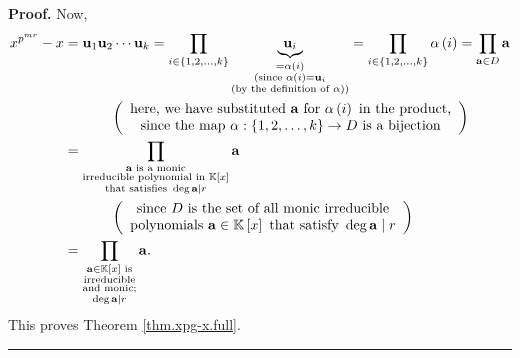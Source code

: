 \documentclass[numbers=enddot,12pt,final,onecolumn,notitlepage]{scrartcl}%
\theoremstyle{definition}
\newenvironment{proof}[1][Proof]{\noindent\textbf{#1.} }{\ \rule{0.5em}{0.5em}}
\let\prodnonlimits\prod
\renewcommand{\prod}{\prodnonlimits\limits}
\begin{document}
\begin{proof}
Now,%
\begin{align*}
x^{p^{mr}}-x  &  =\mathbf{u}_{1}\mathbf{u}_{2}\cdots\mathbf{u}_{k}=\prod
_{i\in\left\{  1,2,\ldots,k\right\}  }\underbrace{\mathbf{u}_{i}%
}_{\substack{=\alpha\left(  i\right)  \\\text{(since }\alpha\left(  i\right)
=\mathbf{u}_{i}\\\text{(by the definition of }\alpha\text{))}}}=\prod
_{i\in\left\{  1,2,\ldots,k\right\}  }\alpha\left(  i\right)  =\prod
_{\mathbf{a}\in D}\mathbf{a}\\
&  \ \ \ \ \ \ \ \ \ \ \left(
\begin{array}
[c]{c}%
\text{here, we have substituted }\mathbf{a}\text{ for }\alpha\left(  i\right)
\text{ in the product,}\\
\text{since the map }\alpha:\left\{  1,2,\ldots,k\right\}  \rightarrow D\text{
is a bijection}%
\end{array}
\right) \\
&  =\prod_{\substack{\mathbf{a}\text{ is a monic}\\\text{irreducible
polynomial in }\mathbb{K}\left[  x\right]  \\\text{that satisfies }%
\deg\mathbf{a}\mid r}}\mathbf{a}\\
&  \ \ \ \ \ \ \ \ \ \ \left(
\begin{array}
[c]{c}%
\text{since }D\text{ is the set of all monic irreducible}\\
\text{polynomials }\mathbf{a}\in\mathbb{K}\left[  x\right]  \text{ that
satisfy }\deg\mathbf{a}\mid r
\end{array}
\right) \\
&  =\prod_{\substack{\mathbf{a}\in\mathbb{K}\left[  x\right]  \text{
is}\\\text{irreducible}\\\text{and monic;}\\\deg\mathbf{a}\mid r}}\mathbf{a.}%
\end{align*}
This proves Theorem \ref{thm.xpg-x.full}.
\end{proof}
\end{document}
